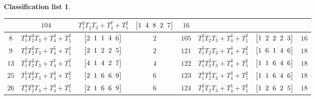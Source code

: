 \documentclass[10pt,a4paper]{amsart}
\theoremstyle{definition}
\newtheorem{class-list}[thm]{Classification list}
\numberwithin{equation}{section}
\begin{document}
\begin{class-list}
\begin{table}[h!]
\begin{tabu}{c|c|c|c||c|c|c|c}
&${104}$&${T_{1}^{2}T_{2}T_{3}+T_{4}^{7}+T_{5}^{2}}$
&$\arraycolsep=1mm\begin{bmatrix}{1} & {4} & {8} & {2} & {7}\end{bmatrix}$&${16}$
\\ \hline
${8}$&${T_{1}^{4}T_{2}^{3}T_{3}+T_{4}^{3}+T_{5}^{2}}$
&$\arraycolsep=1mm\begin{bmatrix}{2} & {1} & {1} & {4} & {6}\end{bmatrix}$&${2}$
&${105}$&${T_{1}^{2}T_{2}T_{3}+T_{4}^{3}+T_{5}^{2}}$
&$\arraycolsep=1mm\begin{bmatrix}{1} & {2} & {2} & {2} & {3}\end{bmatrix}$&${16}$
\\ \hline
${9}$&${T_{1}^{3}T_{2}^{2}T_{3}+T_{4}^{5}+T_{5}^{2}}$
&$\arraycolsep=1mm\begin{bmatrix}{2} & {1} & {2} & {2} & {5}\end{bmatrix}$&${2}$
&${121}$&${T_{1}^{5}T_{2}T_{3}+T_{4}^{3}+T_{5}^{2}}$
&$\arraycolsep=1mm\begin{bmatrix}{1} & {6} & {1} & {4} & {6}\end{bmatrix}$&${18}$
\\ \hline
${13}$&${T_{1}^{2}T_{2}^{2}T_{3}+T_{4}^{7}+T_{5}^{2}}$
&$\arraycolsep=1mm\begin{bmatrix}{4} & {1} & {4} & {2} & {7}\end{bmatrix}$&${4}$
&${122}$&${T_{1}^{4}T_{2}^{2}T_{3}+T_{4}^{3}+T_{5}^{2}}$
&$\arraycolsep=1mm\begin{bmatrix}{1} & {1} & {6} & {4} & {6}\end{bmatrix}$&${18}$
\\ \hline
${25}$&${T_{1}^{5}T_{2}^{2}T_{3}+T_{4}^{3}+T_{5}^{2}}$
&$\arraycolsep=1mm\begin{bmatrix}{2} & {1} & {6} & {6} & {9}\end{bmatrix}$&${6}$
&${123}$&${T_{1}^{3}T_{2}^{3}T_{3}+T_{4}^{3}+T_{5}^{2}}$
&$\arraycolsep=1mm\begin{bmatrix}{1} & {1} & {6} & {4} & {6}\end{bmatrix}$&${18}$
\\ \hline
${26}$&${T_{1}^{4}T_{2}^{4}T_{3}+T_{4}^{3}+T_{5}^{2}}$
&$\arraycolsep=1mm\begin{bmatrix}{2} & {1} & {6} & {6} & {9}\end{bmatrix}$&${6}$
&${124}$&${T_{1}^{2}T_{2}T_{3}+T_{4}^{5}+T_{5}^{2}}$
&$\arraycolsep=1mm\begin{bmatrix}{1} & {2} & {6} & {2} & {5}\end{bmatrix}$&${18}$

\end{tabu}
\end{table}
\end{class-list}
\end{document}

